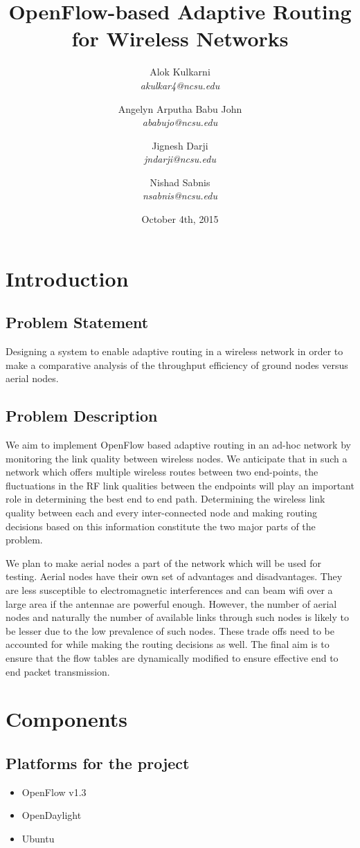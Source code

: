 \documentclass{article}
\title{OpenFlow-based Adaptive Routing for Wireless Networks}
\author{
    Alok Kulkarni \\
    \textit{akulkar4@ncsu.edu}
    \and
    Angelyn Arputha Babu John \\
    \textit{ababujo@ncsu.edu}
    \and
    Jignesh Darji \\
    \textit{jndarji@ncsu.edu}
    \and 
    Nishad Sabnis \\
    \textit{nsabnis@ncsu.edu}
}
\date{October 4th, 2015}
\begin{document}
\maketitle
\section{Introduction}
\subsection{Problem Statement}
Designing a system to enable adaptive routing in a wireless network in order to make a comparative analysis of the
throughput efficiency of ground nodes versus aerial nodes.
\subsection{Problem Description}
\par We aim to implement OpenFlow based adaptive routing in an ad-hoc network by monitoring the link quality between wireless
nodes. We anticipate that in such a network which offers multiple wireless routes between two end-points, the
fluctuations in the RF link qualities between the endpoints will play an important role in determining the best end to
end path. Determining the wireless link quality between each and every inter-connected node and making routing decisions
based on this information constitute the two major parts of the problem. 
\par We plan to make aerial nodes a part of the network which will be used for testing. Aerial nodes have their own set of
advantages and disadvantages. They are less susceptible to electromagnetic interferences and can beam wifi over a large
area if the antennae are powerful enough. However, the number of aerial nodes and naturally the number of available
links through such nodes is likely to be lesser due to the low prevalence of such nodes. These trade offs need to be
accounted for while making the routing decisions as well. The final aim is to ensure that the flow tables are
dynamically modified to ensure effective end to end packet transmission. 
\section{Components}
\subsection{Platforms for the project}
\begin{itemize}
\item OpenFlow v1.3
\item OpenDaylight
\item Ubuntu
\end{itemize}
\end{document}
